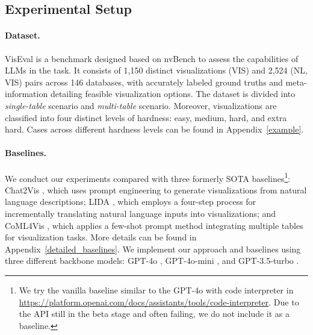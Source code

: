\subsection{Experimental Setup}
\label{setup}
\paragraph{Dataset.}
VisEval \cite{viseval} is a benchmark designed based on nvBench \cite{nvbench} to assess the capabilities of LLMs in the \nlvis task. It consists of 1,150 distinct visualizations (VIS) and 2,524 (NL, VIS) pairs across 146 databases, with accurately labeled ground truths and meta-information detailing feasible visualization options. The dataset is divided into \textit{single-table} scenario and \textit{multi-table} scenario. Moreover, visualizations are classified into four distinct levels of hardness: easy, medium, hard, and extra hard. Cases across different hardness levels can be found in Appendix~\ref{example}.

\paragraph{Baselines.} We conduct our experiments compared with three formerly SOTA baselines\footnote{We try the vanilla baseline similar to the GPT-4o with code interpreter in \url{https://platform.openai.com/docs/assistants/tools/code-interpreter}. Due to the API still in the beta stage and often failing, we do not include it as a baseline.}: Chat2Vis \cite{chat2vis}, which uses prompt engineering to generate visualizations from natural language descriptions; LIDA \cite{lida}, which employs a four-step process for incrementally translating natural language inputs into visualizations; and CoML4Vis \cite{coml}, which applies a few-shot prompt method integrating multiple tables for visualization tasks. 
More details can be found in Appendix~\ref{detailed_baselines}.
We implement our approach and baselines using three different backbone models: GPT-4o \citep{openai_gpt4o_2024}, GPT-4o-mini \citep{openai2024gpt4omini}, and GPT-3.5-turbo \citep{chatgpt3.5}. 

